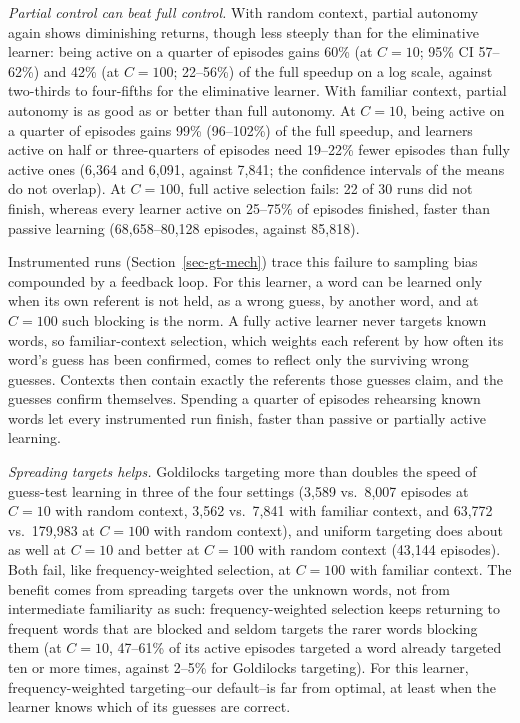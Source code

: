 \documentclass[11pt]{article}
\begin{document}
\textit{Partial control can beat full control.} With random context, partial autonomy again shows diminishing returns, though less steeply than for the eliminative learner: being active on a quarter of episodes gains 60\% (at $C=10$; 95\% CI 57--62\%) and 42\% (at $C=100$; 22--56\%) of the full speedup on a log scale, against two-thirds to four-fifths for the eliminative learner. With familiar context, partial autonomy is as good as or better than full autonomy. At $C=10$, being active on a quarter of episodes gains 99\% (96--102\%) of the full speedup, and learners active on half or three-quarters of episodes need 19--22\% fewer episodes than fully active ones (6,364 and 6,091, against 7,841; the confidence intervals of the means do not overlap). At $C=100$, full active selection fails: 22 of 30 runs did not finish, whereas every learner active on 25--75\% of episodes finished, faster than passive learning (68,658--80,128 episodes, against 85,818).

Instrumented runs (Section~\ref{sec-gt-mech}) trace this failure to sampling bias compounded by a feedback loop. For this learner, a word can be learned only when its own referent is not held, as a wrong guess, by another word, and at $C=100$ such blocking is the norm. A fully active learner never targets known words, so familiar-context selection, which weights each referent by how often its word's guess has been confirmed, comes to reflect only the surviving wrong guesses. Contexts then contain exactly the referents those guesses claim, and the guesses confirm themselves. Spending a quarter of episodes rehearsing known words let every instrumented run finish, faster than passive or partially active learning.

\textit{Spreading targets helps.} Goldilocks targeting more than doubles the speed of guess-test learning in three of the four settings (3,589 vs.\ 8,007 episodes at $C=10$ with random context, 3,562 vs.\ 7,841 with familiar context, and 63,772 vs.\ 179,983 at $C=100$ with random context), and uniform targeting does about as well at $C=10$ and better at $C=100$ with random context (43,144 episodes). Both fail, like frequency-weighted selection, at $C=100$ with familiar context. The benefit comes from spreading targets over the unknown words, not from intermediate familiarity as such: frequency-weighted selection keeps returning to frequent words that are blocked and seldom targets the rarer words blocking them (at $C=10$, 47--61\% of its active episodes targeted a word already targeted ten or more times, against 2--5\% for Goldilocks targeting). For this learner, frequency-weighted targeting--our default--is far from optimal, at least when the learner knows which of its guesses are correct.
\end{document}
